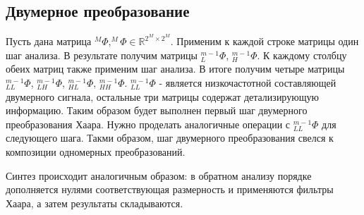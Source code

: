 \documentclass[oneside, final, 14pt]{article}
\begin{document}
\subsection{Двумерное преобразование}
Пусть дана матрица $^{M}\Phi, ^{M}\Phi \in \mathbb{R}^{2^{M}\times2^{M}}$. Применим к каждой строке матрицы один шаг анализа. В результате получим матрицы $_L^{m-1}\Phi$, $_H^{m-1}\Phi$. К каждому столбцу обеих матриц также применим шаг анализа. В итоге получим четыре матрицы $_{LL}^{m-1}\Phi$, $_{LH}^{m-1}\Phi$, $_{HL}^{m-1}\Phi$, $_{HH}^{m-1}\Phi$. $_{LL}^{m-1}\Phi$ - является низкочастотной составляющей двумерного сигнала, остальные три матрицы содержат детализирующую информацию. Таким образом будет выполнен первый шаг двумерного преобразования Хаара. Нужно проделать аналогичные операции с $_{LL}^{m-1}\Phi$ для следующего шага. Такми образом, шаг двумерного преобразования свелся к композиции одномерных преобразований.

Синтез происходит аналогичным образом: в обратном анализу порядке дополняется нулями соответствующая размерность и применяются фильтры Хаара, а затем результаты складываются.
\end{document}

